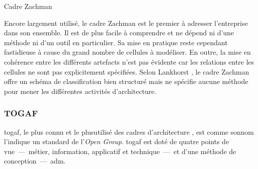 %
%
%

\begin{table}[!ht]
    \vspace*{0.4cm}
    
    \caption{Cadre Zachman \protect\cite{zachman1987framework}}
    \label{fig:Zachman}
\end{table}


Encore largement utilisé, le cadre Zachman est le premier à adresser
l'entreprise dans son ensemble. Il est de plus facile à comprendre et ne dépend
ni d'une méthode ni d'un outil en particulier. Sa mise en pratique reste
cependant fastidieuse à cause du grand nombre de cellules à modéliser. En
outre, la mise en cohérence entre les différents artefacts n'est pas évidente
car les relations entre les cellules ne sont pas explicitement spécifiées.
Selon Lankhorst \cite{lankhorst2013enterprise}, le cadre Zachman offre un
schéma de classification bien structuré mais ne spécifie aucune méthode pour
mener les différentes activités d'architecture.

\subsubsection{TOGAF} 

\gls{togaf}, le plus connu et le plusutilisé des cadres d'architecture \cite{winter2008enterprise}, est comme sonnom l'indique un standard de l'\textit{Open Group}. \gls{togaf} est doté de quatre points de vue~—~métier, information, applicatif et technique~—~et d'une méthode de conception~—~\gls{adm}. 

